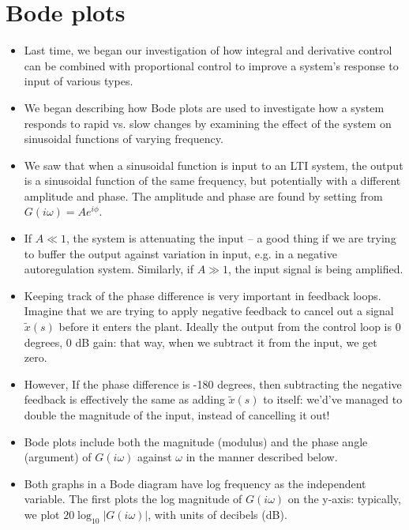 \documentclass{article}
\begin{document}
\large
\section*{Bode plots}

\begin{itemize}

\item Last time, we began our investigation of how integral and derivative control can be combined with proportional control to improve a system's response to input of various types.

\item We began describing how Bode plots are used to investigate how a system responds to rapid vs. slow changes by examining the effect of the system on sinusoidal functions of varying frequency.

\item We saw that when a sinusoidal function is input to an LTI system, the output is a sinusoidal function of the same frequency, but potentially with a different amplitude and phase. The amplitude and phase are found by setting from $G(i\omega) = A e^{i \phi}$.

\item If $A \ll 1$, the system is attenuating the input -- a good thing if we are trying to buffer the output against variation in input, e.g. in a negative autoregulation system. Similarly, if $A \gg 1$, the input signal is being amplified.

\item Keeping track of the phase difference is very important in feedback loops. Imagine that we are trying to apply negative feedback to cancel out a signal $\tilde{x}(s)$ before it enters the plant. Ideally the output from the control loop is 0 degrees, 0 dB gain: that way, when we subtract it from the input, we get zero.

\item However, If the phase difference is -180 degrees, then subtracting the negative feedback is effectively the same as adding $\tilde{x}(s)$ to itself: we'd've managed to double the magnitude of the input, instead of cancelling it out!

\item Bode plots include both the magnitude (modulus) and the phase angle (argument) of $G(i\omega)$ against $\omega$ in the manner described below.

\item Both graphs in a Bode diagram have log frequency as the independent variable. The first plots the log magnitude of $G(i\omega)$ on the y-axis: typically, we plot $20 \log_{10} | G(i \omega) |$, with units of decibels (dB).


\end{itemize}
\end{document}
